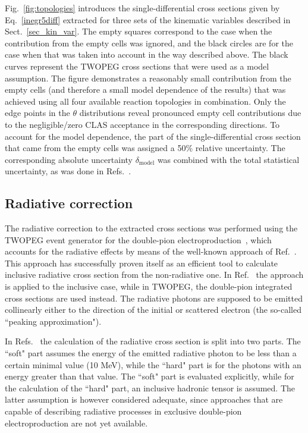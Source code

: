 \documentclass[prc,twocolumn,superscriptaddress,showpacs,amssymb,amsmath,amsfonts,aps,nofootinbib]{revtex4-1}
\begin{document}
Fig.~\ref{fig:topologies} introduces the single-differential cross sections given by Eq.~\eqref{inegr5diff} extracted for three sets of the kinematic variables described in Sect.~\ref{sec_kin_var}.  The empty squares correspond to the case when the contribution from the empty cells was ignored, and the  black circles are for the case when that was taken into account in the way described above. The black curves represent the TWOPEG cross sections that were used as a model assumption. The figure demonstrates a reasonably small contribution from the empty cells (and therefore a small model dependence of the results) that was achieved using all four available reaction topologies in combination. Only the edge points in the $\theta$ distributions reveal pronounced empty cell contributions  due to the negligible/zero CLAS acceptance in the corresponding directions. 
To account for the model dependence, the part of the single-differential cross section that came from the empty cells was assigned a 50\% relative uncertainty. The corresponding absolute uncertainty $\delta_{\text{model}}$ was combined with the total statistical uncertainty, as was done in Refs.~\cite{Isupov:2017lnd,Golovach:note}. 






\subsection{Radiative correction}
\label{rad_corr}


The radiative correction to the extracted cross sections was performed using the TWOPEG event generator for the double-pion electroproduction~\cite{Skorodum:EG}, which accounts for the radiative effects by means of the well-known approach of Ref.~\cite{Mo:1968cg}. 
This approach has successfully proven itself as an efficient tool to calculate inclusive radiative cross section from the non-radiative one.
In Ref.~\cite{Mo:1968cg} the approach is applied to the inclusive case, while in TWOPEG, the double-pion integrated cross sections are used instead. The radiative photons are supposed to be emitted collinearly either to the direction of the initial or scattered electron (the so-called ``peaking approximation").

In Refs.~\cite{Mo:1968cg,Skorodum:EG} the calculation of the radiative cross section is split into two parts. The ``soft" part assumes the energy of the  emitted radiative photon to be less than a certain minimal value (10 MeV), while the ``hard" part is for the photons with an energy greater than that value. 
The ``soft" part is evaluated
explicitly, while for the calculation of the ``hard" part, an inclusive hadronic
tensor is assumed. 
The latter assumption is however considered adequate, since approaches
that are capable of describing radiative processes
in exclusive double-pion electroproduction are not yet available.
\end{document}
